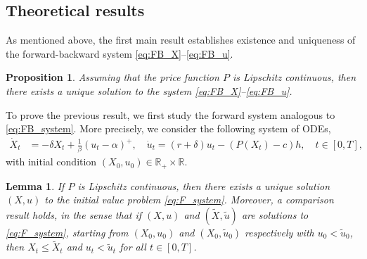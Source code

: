 \documentclass[12pt]{article}
\newtheorem{lemma}{Lemma}[section]
\newtheorem{proposition}{Proposition}[section]
\def \R{\mathbb{R}}
\begin{document}
\subsection{Theoretical results}

As mentioned above, the first main result establishes existence and uniqueness of the forward-backward system \eqref{eq:FB_X}--\eqref{eq:FB_u}.

\begin{proposition}\label{prop:existence_uniqueness}
    Assuming that the price function $P$ is Lipschitz continuous, then there exists a unique solution to the system \eqref{eq:FB_X}--\eqref{eq:FB_u}. 
\end{proposition}

To prove the previous result, we first study the forward system analogous to \eqref{eq:FB_system}. More precisely, we consider the following system of ODEs,
\begin{align}\label{eq:F_system}
\dot{X}_t &= - \delta X_t + \frac{1}{\beta}(u_t-\alpha)^+, \quad \dot{u}_{t} =(r+\delta)u_{t}-\left(P(X_t)-c\right)h, \quad t \in [0,T],
\end{align}
with initial condition $(X_0,u_0) \in \R_+ \times \R$.

\begin{lemma}\label{lem:ODE_forward}
    If $P$ is Lipschitz continuous, then there exists a unique solution $(X,u)$ to the initial value problem \eqref{eq:F_system}. Moreover, a comparison result holds, in the sense that if $(X,u)$ and $(\tilde X, \tilde{u})$ are solutions to \eqref{eq:F_system}, starting from $(X_0,u_0)$ and $(X_0, \tilde{u}_0)$ respectively with $u_0 < \tilde{u}_0$, then $X_t \leq \tilde X_t$ and $u_t < \tilde u_t$ for all $t \in [0,T]$.
\end{lemma}
\end{document}
